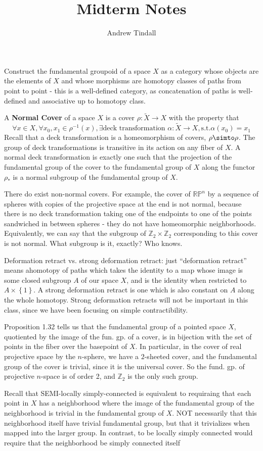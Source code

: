 \documentclass[12pt]{article}
\newcommand{\Z}{\mathbb{Z}}
\newcommand{\R}{\mathbb{R}}
\theoremstyle{definition}
\begin{document}
 
 
\title{Midterm Notes}
\author{Andrew Tindall}
 
\maketitle
Construct the fundamental groupoid of a space $X$ as a category whose objects are the elements of $X$ and whose morphisms are homotopy classes of paths from point to point - this is a well-defined category, as concatenation of paths is well-defined and associative up to homotopy class.
\par A \textbf{Normal Cover} of a space $X$ is a cover $\rho: \tilde X \to X$ with the property that 
\[ \forall x \in X, \forall x_0, x_1 \in \rho^{-1}(x), \exists \text{deck transformation }\alpha: \tilde X \to X, \text{s.t.} \alpha(x_{0}) = x_1\]
Recall that a deck transformation is a homeomorphism of covers, $\rho \simto \rho$. The group of deck transformations is transitive in its action on any fiber of $X$. A normal deck transformation is exactly one such that the projection of the fundamental group of the cover to the fundamental group of $X$ along the functor $\rho_*$ is a normal subgroup of the fundamental group of $X$. 
\par There do exist non-normal covers. For example, the cover of $\R \mathbb P^n$ by a sequence of spheres  with copies of the projective space at the end is not normal, because there is no deck transformation taking one of the endpoints to one of the points sandwiched in between spheres - they do not have homeomorphic neighborhoods. Equivalently, we can say that the subgroup of $\Z_2 \times \Z_2$ corresponding to this cover is not normal. What subgroup is it, exactly? Who
knows.
\par Deformation retract vs. strong deformation retract: just ``deformation retract'' means ahomotopy of paths which takes the identity to a map whose image is some closed subgroup $A$ of our space $X$, and is the identity when restricted to $A \times \left\{ 1 \right\}$. A strong deformation retract is one which is also constant on $A$ along the whole homotopy. Strong deformation retracts will not be important in this class, since we have been focusing on simple contractibility.
\par Proposition 1.32 tells us that the fundamental group of a pointed space $X$, quotiented by the image of the fun. gp. of a cover, is in bijection with the set of points in the fiber over the basepoint of $X$. In particular, in the cover of real projective space by the $n$-sphere, we have a $2$-sheeted cover, and the fundamental group of the cover is trivial, since it is the universal cover. So the fund. gp. of projective $n$-space is of order 2, and $\Z_2$ is the only such group.
\par Recall that SEMI-locally simply-connected is equivalent to requiraing that each point in $X$ has a neighborhood where the image of the fundamental group of the neighborhood is trivial in the fundamental group of $X$. NOT necessarily that this neighborhood itself have trivial fundamental group, but that it trivializes when mapped into the larger group. In contrast, to be locally simply connected would require that the neighborhood be simply connected itself
\end{document}
